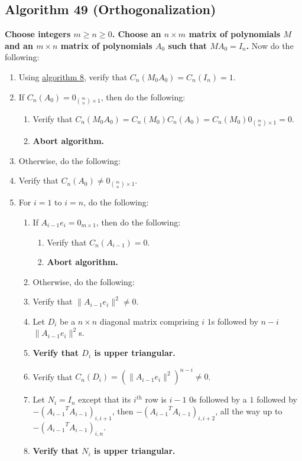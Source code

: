 \documentclass[twocolumn]{article}
\begin{document}
		\subsection{Algorithm 49 (Orthogonalization)}\label{sec:algorithm 49}
			\textbf{Choose integers $m\ge n\ge 0$. Choose an $n\times m$ matrix of polynomials $M$ and an $m\times n$ matrix of polynomials $A_0$ such that $MA_0=I_n$.} Now do the following:
			\begin{enumerate}
				\item Using \hyperref[sec:algorithm 8]{algorithm 8}, verify that $C_n(M_0A_0)=C_n(I_n)=1$.
				\item If $C_n(A_0)=0_{\binom{m}{n}\times 1}$, then do the following:
				\begin{enumerate}
					\item Verify that $C_n(M_0A_0)=C_n(M_0)C_n(A_0)=C_n(M_0)0_{\binom{m}{n}\times 1}=0$.
					\item \textbf{Abort algorithm.}
				\end{enumerate}
				\item Otherwise, do the following:
				\item Verify that $C_n(A_0)\ne0_{\binom{m}{n}\times 1}$.
				\item For $i=1$ to $i=n$, do the following:
				\begin{enumerate}
					\item If $A_{i-1}e_i=0_{m\times 1}$, then do the following:
					\begin{enumerate}
						\item Verify that $C_n(A_{i-1})=0$.
						\item \textbf{Abort algorithm.}
					\end{enumerate}
					\item Otherwise, do the following:
					\item Verify that $\lVert A_{i-1}e_i\rVert^2\ne 0$.
					\item Let $D_i$ be a $n\times n$ diagonal matrix comprising $i$ $1$s followed by $n-i$ $\lVert A_{i-1}e_i\rVert^2$s.
					\item \textbf{Verify that $D_i$ is upper triangular.}
					\item Verify that $C_n(D_i)=(\lVert A_{i-1}e_i\rVert^2)^{n-i}\ne 0$.
					\item Let $N_i=I_n$ except that its $i^{th}$ row is $i-1$ $0$s followed by a $1$ followed by $-({A_{i-1}}^TA_{i-1})_{i,i+1}$, then $-({A_{i-1}}^TA_{i-1})_{i,i+2}$, all the way up to $-({A_{i-1}}^TA_{i-1})_{i,n}$.
					\item \textbf{Verify that $N_i$ is upper triangular.}

\end{enumerate}
\end{enumerate}
\end{document}
